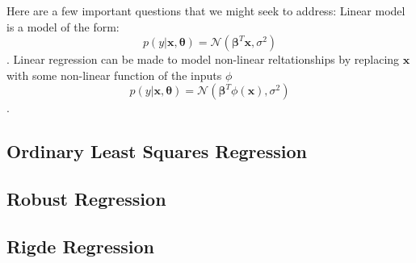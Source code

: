 Here are a few important questions that we might seek to address:
Linear model is a model of the form:
$$ p(y|\bm{x}, \bm{\theta}) = \mathcal{N}\left(
\bm{\beta}^{T}\bm{x},\sigma^{2}\right)$$.
Linear regression can be made to model non-linear reltationships by replacing
$\bm{x}$ with some non-linear function of the inputs $\phi$
$$ p(y|\bm{x}, \bm{\theta}) = \mathcal{N}\left(
\bm{\beta}^{T}\phi(\bm{x}),\sigma^{2}\right)$$.
%
\subsection{Ordinary Least Squares Regression}

\subsection{Robust Regression}

\subsection{Rigde Regression}

%
%
